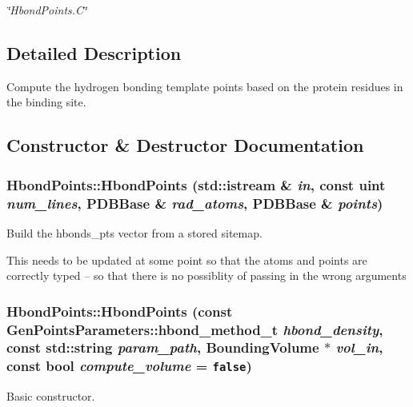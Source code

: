 \begin{CompactItemize}
\begin{CompactList}\small\item\em \char`\"{}Hbond\-Points.C\char`\"{} \item\end{CompactList}\end{CompactItemize}


\subsection{Detailed Description}
Compute the hydrogen bonding template points based on the protein residues in the binding site. 



\subsection{Constructor \& Destructor Documentation}
\subsubsection{\setlength{\rightskip}{0pt plus 5cm}Hbond\-Points::Hbond\-Points (std::istream \& {\em in}, const uint {\em num\_\-lines}, \bf{PDBBase} \& {\em rad\_\-atoms}, \bf{PDBBase} \& {\em points})}\label{classASCbase_1_1HbondPoints_da198374071ef598a898466343ca4d17}


Build the hbonds\_\-pts vector from a stored sitemap. 

This needs to be updated at some point so that the atoms and points are correctly typed -- so that there is no possiblity of passing in the wrong arguments 
\subsubsection{\setlength{\rightskip}{0pt plus 5cm}Hbond\-Points::Hbond\-Points (const \bf{Gen\-Points\-Parameters::hbond\_\-method\_\-t} {\em hbond\_\-density}, const std::string {\em param\_\-path}, \bf{Bounding\-Volume} $\ast$ {\em vol\_\-in}, const bool {\em compute\_\-volume} = {\tt false})}\label{classASCbase_1_1HbondPoints_ffcbf1d30cd9190ad924c5a263f387c6}


Basic constructor. 

